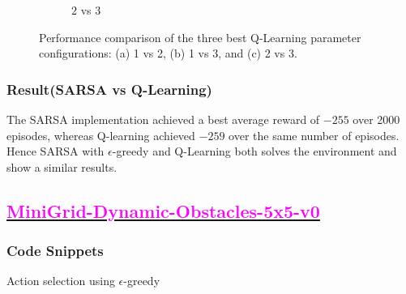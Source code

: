 \documentclass[11pt, a4]{article}
\begin{document}
\begin{figure}[H]
\begin{subfigure}{.8\textwidth}
						\caption{$2$ vs $3$}
						\label{fig:qlearningmountaincar2vs3}
					\end{subfigure}
					\caption{Performance comparison of the three best Q-Learning parameter configurations: (a) 1 vs 2, (b) 1 vs 3, and (c) 2 vs 3.}
					\label{fig:qlearningmountaincar}
				\end{figure}
			\subsubsection{Result(SARSA vs Q-Learning)}		
				The SARSA implementation achieved a best average reward of \(-255\) over 2000 episodes, whereas Q-learning achieved \(-259\) over the same number of episodes.  Hence SARSA with $\epsilon$-greedy and Q-Learning both solves the environment and show a similar results.
		\subsection{\href{https://github.com/RitabrataMandal/RL-DA6400-assignment_1/tree/main/minigrid_world}{\textcolor{magenta}{MiniGrid-Dynamic-Obstacles-5x5-v0}}}
			\subsubsection{Code Snippets}
				Action selection using $\epsilon$-greedy
				
				
				
				
\end{document}
